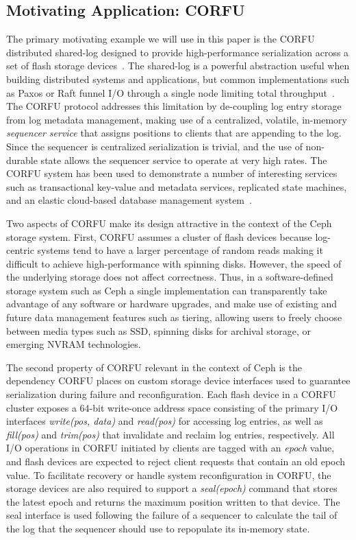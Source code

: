 \documentclass[10pt,twocolumn]{article}
\begin{document}
\subsection{Motivating Application: CORFU}
\label{sec:corfu}

The primary motivating example we will use in this paper is the CORFU
distributed shared-log designed to provide high-performance serialization
across a set of flash storage devices~\cite{balakrishnan:nsdi12}. The
shared-log is a powerful abstraction useful when building distributed systems
and applications, but common implementations such as Paxos or Raft funnel I/O
through a single node limiting total throughput~\cite{lamport:tocs89}. The CORFU protocol addresses this limitation
by de-coupling log entry storage from log metadata management, making use of a
centralized, volatile, in-memory \emph{sequencer service} that assigns
positions to clients that are appending to the log. Since the sequencer is
centralized serialization is trivial, and the use of non-durable state allows
the sequencer service to operate at very high rates. The CORFU system has been
used to demonstrate a number of interesting services such as transactional
key-value and metadata services, replicated state machines, and an elastic
cloud-based database management system~\cite{balakrishnan:sosp13,bernstein:cidr11}.

Two aspects of CORFU make its design attractive in the context of the Ceph
storage system. First, CORFU assumes a cluster of flash devices because
log-centric systems tend to have a larger percentage of random reads making it
difficult to achieve high-performance with spinning disks. However, the speed
of the underlying storage does not affect correctness. Thus, in a
software-defined storage system such as Ceph a single implementation can
transparently take advantage of any software or hardware upgrades, and make use
of existing and future data management features such as tiering,
allowing users to freely choose between media types such as SSD, spinning
disks for archival storage, or emerging NVRAM technologies.

The second property of CORFU relevant in the context of Ceph is the dependency
CORFU places on custom storage device interfaces used to guarantee
serialization during failure and reconfiguration. Each flash device in a CORFU
cluster exposes a 64-bit write-once address space consisting of the primary I/O
interfaces \emph{write(pos, data)} and \emph{read(pos)} for accessing log
entries, as well as \emph{fill(pos)} and \emph{trim(pos)} that invalidate and
reclaim log entries, respectively. All I/O operations in CORFU initiated by
clients are tagged with an \emph{epoch} value, and flash devices are expected
to reject client requests that contain an old epoch value. To facilitate
recovery or handle system reconfiguration in CORFU, the storage devices are
also required to support a \emph{seal(epoch)} command that stores the latest
epoch and returns the maximum position written to that device. The seal
interface is used following the failure of a sequencer to calculate the tail of
the log that the sequencer should use to repopulate its in-memory state.
\end{document}
